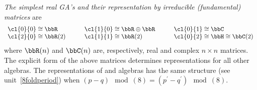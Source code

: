 %
\begin{unit}\label{simplereps}\textit{The simplest real GA's and their representation by irreducible (fundamental) matrices} are
\[\begin{array}{lll}
 \cl{0}{0}\cong\bbR\qquad&\cl{1}{0}\cong\bbR\oplus\bbR\qquad&\cl{0}{1}\cong\bbC\\
 \cl{2}{0}\cong\bbR(2)\qquad& \cl{1}{1}\cong\bbR(2)\qquad&
 \cl{0}{2}\cong\bbH\cong\bbC(2)
  \end{array}\]
where $\bbR(n)$ and $\bbC(n)$ are, respectively, real and complex
$n\times n$ matrices. The explicit form of the above matrices
determines representations for all other  algebras. The
representations of  and  algebras
has the same structure (see unit~\ref{8foldperiod}) when
$(p-q)\mod(8)=(p^\prime-q^\prime)\mod(8)$.
\end{unit}
%
